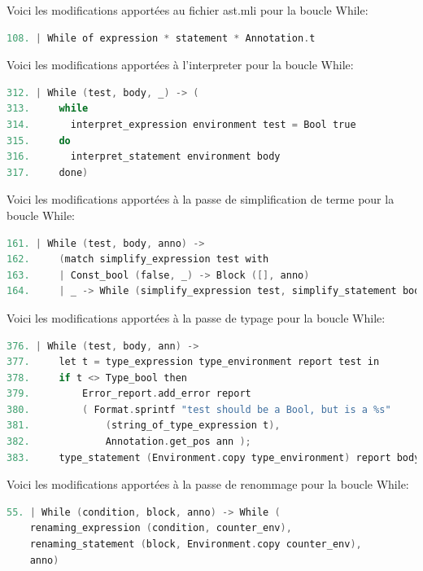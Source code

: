 \documentclass{report}
\begin{document}
    Voici les modifications apportées au fichier ast.mli pour la boucle While: \\

    \begin{lstlisting}[language=C, basicstyle=\ttfamily]
108. | While of expression * statement * Annotation.t
    \end{lstlisting}
    
    Voici les modifications apportées à l'interpreter pour la boucle While: \\

    \begin{lstlisting}[language=C, basicstyle=\ttfamily]
312. | While (test, body, _) -> (
313.     while
314.       interpret_expression environment test = Bool true
315.     do
316.       interpret_statement environment body
317.     done)
    \end{lstlisting}

    Voici les modifications apportées à la passe de simplification de terme pour la boucle While: \\

    \begin{lstlisting}[language=C, basicstyle=\ttfamily]
161. | While (test, body, anno) ->
162.     (match simplify_expression test with
163.     | Const_bool (false, _) -> Block ([], anno)
164.     | _ -> While (simplify_expression test, simplify_statement body, anno))
    \end{lstlisting}

    Voici les modifications apportées à la passe de typage pour la boucle While: \\

    \begin{lstlisting}[language=C, basicstyle=\ttfamily]
376. | While (test, body, ann) ->
377.     let t = type_expression type_environment report test in
378.     if t <> Type_bool then
379.         Error_report.add_error report
380.         ( Format.sprintf "test should be a Bool, but is a %s"
381.             (string_of_type_expression t),
382.             Annotation.get_pos ann );
383.     type_statement (Environment.copy type_environment) report body
    \end{lstlisting}

    Voici les modifications apportées à la passe de renommage pour la boucle While: \\

    \begin{lstlisting}[language=C, basicstyle=\ttfamily]
55. | While (condition, block, anno) -> While (
    renaming_expression (condition, counter_env),
    renaming_statement (block, Environment.copy counter_env),
    anno)
    \end{lstlisting}
\end{document}
